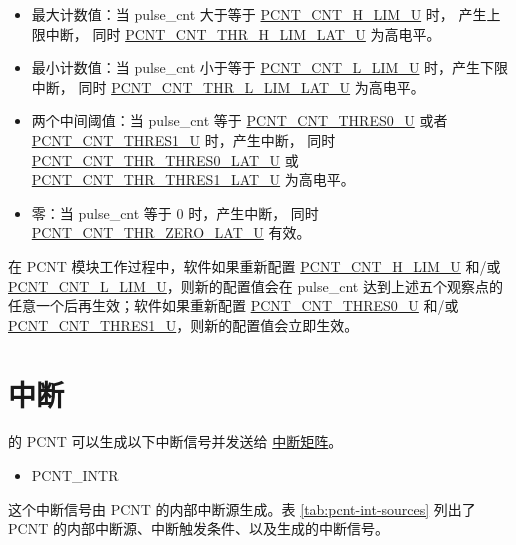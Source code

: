 \documentclass[main\_\_CN.tex]{subfiles}
\begin{document}
\begin{itemize}
    \item 最大计数值：当 pulse\_cnt 大于等于 \hyperref[fielddesc:PCNTCNTHLIMUN]{PCNT\_CNT\_H\_LIM\_U} 时， 产生上限中断， 同时 \hyperref[fielddesc:PCNTCNTTHRHLIMLATUN]{PCNT\_CNT\_THR\_H\_LIM\_LAT\_U} 为高电平。
    \item 最小计数值：当 pulse\_cnt 小于等于 \hyperref[fielddesc:PCNTCNTLLIMUN]{PCNT\_CNT\_L\_LIM\_U} 时，产生下限中断， 同时 \hyperref[fielddesc:PCNTCNTTHRLLIMLATUN]{PCNT\_CNT\_THR\_L\_LIM\_LAT\_U} 为高电平。
    \item 两个中间阈值：当 pulse\_cnt 等于 \hyperref[fielddesc:PCNTCNTTHRES0UN]{PCNT\_CNT\_THRES0\_U} 或者 \hyperref[fielddesc:PCNTCNTTHRES1UN]{PCNT\_CNT\_THRES1\_U} 时，产生中断， 同时 \hyperref[fielddesc:PCNTCNTTHRTHRES0LATUN]{PCNT\_CNT\_THR\_THRES0\_LAT\_U} 或 \hyperref[fielddesc:PCNTCNTTHRTHRES1LATUN]{PCNT\_CNT\_THR\_THRES1\_LAT\_U} 为高电平。
    \item 零：当 pulse\_cnt 等于 0 时，产生中断， 同时 \hyperref[fielddesc:PCNTCNTTHRZEROLATUN]{PCNT\_CNT\_THR\_ZERO\_LAT\_U} 有效。
\end{itemize}

在 PCNT 模块工作过程中，软件如果重新配置 \hyperref[fielddesc:PCNTCNTHLIMUN]{PCNT\_CNT\_H\_LIM\_U} 和/或 \hyperref[fielddesc:PCNTCNTLLIMUN]{PCNT\_CNT\_L\_LIM\_U}，则新的配置值会在 pulse\_cnt 达到上述五个观察点的任意一个后再生效；软件如果重新配置 \hyperref[fielddesc:PCNTCNTTHRES0UN]{PCNT\_CNT\_THRES0\_U} 和/或 \hyperref[fielddesc:PCNTCNTTHRES1UN]{PCNT\_CNT\_THRES1\_U}，则新的配置值会立即生效。


\section{中断}

\chipname{} 的 PCNT 可以生成以下中断信号并发送给 \hyperref[mod:intmtrx]{中断矩阵}。

    \begin{itemize}
        \item PCNT\_INTR
    \end{itemize}

这个中断信号由 PCNT 的内部中断源生成。表 \ref{tab:pcnt-int-sources} 列出了 PCNT 的内部中断源、中断触发条件、以及生成的中断信号。
\end{document}
